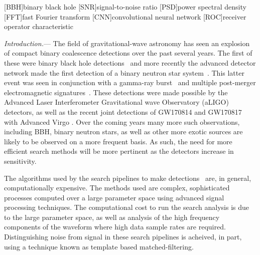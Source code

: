 \documentclass[%
showpacs,
 amsmath,amssymb,
 aps,
 twocolumn,
 prl,
 reprint,
floatfix,
]{revtex4-1}
\begin{document}
\maketitle

[BBH]{binary black hole}
[SNR]{signal-to-noise ratio}
[PSD]{power spectral density}
[FFT]{fast Fourier transform}
[CNN]{convolutional neural network}
[ROC]{receiver operator characteristic}


%
%

%
%
\textit{Introduction.}--- 
%
%
The field of gravitational-wave astronomy has seen an explosion of compact
binary coalescence detections over the past several years. The first of these
were binary black hole detections~\cite{PhysRevLett.116.061102,
PhysRevLett.116.241103, PhysRevLett.118.221101} and more recently the advanced
detector network made the first detection of a binary neutron star
system~\cite{PhysRevLett.119.161101}. This latter event was seen in conjunction
with a gamma-ray
burst~\cite{2017arXiv171005834L,2017arXiv171005446G,2017arXiv171005449S} and
multiple post-merger electromagnetic signatures~\cite{2017arXiv171005833L}.
These detections were made possible by the Advanced Laser Interferometer
Gravitational wave Observatory (aLIGO) detectors, as well as the recent joint
detections of GW170814 and GW170817 with Advanced Virgo
\cite{PhysRevLett.119.141101,PhysRevLett.119.161101}. Over the coming years
many more such observations, including \ac{BBH}, binary neutron stars, as well
as other more exotic sources are likely to be observed on a more frequent basis. As
such, the need for more efficient search methods will be more pertinent as the
detectors increase in sensitivity.

%
%
The algorithms used by the search pipelines to make
detections~\cite{0264-9381-33-21-215004, 0004-637X-748-2-136,
PhysRevD.90.082004} are, in general, computationally expensive. The methods
used are complex, sophisticated processes computed over a large parameter space
using advanced signal processing techniques. The computational cost to run the
search analysis is due to the large parameter space, as well as analysis of the high frequency components 
of the waveform where high data sample rates are required. 
Distinguishing noise from signal in these search pipelines
is acheived, in part, using a technique known as template based matched-filtering. 
\end{document}
